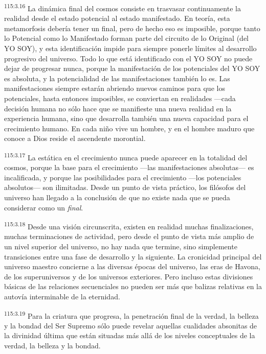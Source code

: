 \documentclass[twoside, 11pt]{book}
\begin{document}
\par
\textsuperscript{115:3.16} La dinámica final del cosmos consiste en trasvasar continuamente la realidad desde el estado potencial al estado manifestado. En teoría, esta metamorfosis debería tener un final, pero de hecho eso es imposible, porque tanto lo Potencial como lo Manifestado forman parte del circuito de lo Original (del YO SOY), y esta identificación impide para siempre ponerle límites al desarrollo progresivo del universo. Todo lo que está identificado con el YO SOY no puede dejar de progresar nunca, porque la manifestación de los potenciales del YO SOY es absoluta, y la potencialidad de las manifestaciones también lo es. Las manifestaciones siempre estarán abriendo nuevos caminos para que los potenciales, hasta entonces imposibles, se conviertan en realidades ---cada decisión humana no sólo hace que se manifieste una nueva realidad en la experiencia humana, sino que desarrolla también una nueva capacidad para el crecimiento humano. En cada niño vive un hombre, y en el hombre maduro que conoce a Dios reside el ascendente morontial.

\par
\textsuperscript{115:3.17} La estática en el crecimiento nunca puede aparecer en la totalidad del cosmos, porque la base para el crecimiento ---las manifestaciones absolutas--- es incalificada, y porque las posibilidades para el crecimiento ---los potenciales absolutos--- son ilimitadas. Desde un punto de vista práctico, los filósofos del universo han llegado a la conclusión de que no existe nada que se pueda considerar como un \textit{final}.

\par
\textsuperscript{115:3.18} Desde una visión circunscrita, existen en realidad muchas finalizaciones, muchas terminaciones de actividad, pero desde el punto de vista más amplio de un nivel superior del universo, no hay nada que termine, sino simplemente transiciones entre una fase de desarrollo y la siguiente. La cronicidad principal del universo maestro concierne a las diversas épocas del universo, las eras de Havona, de los superuniversos y de los universos exteriores. Pero incluso estas divisiones básicas de las relaciones secuenciales no pueden ser más que balizas relativas en la autovía interminable de la eternidad.

\par
\textsuperscript{115:3.19} Para la criatura que progresa, la penetración final de la verdad, la belleza y la bondad del Ser Supremo sólo puede revelar aquellas cualidades absonitas de la divinidad última que están situadas más allá de los niveles conceptuales de la verdad, la belleza y la bondad.
\end{document}
